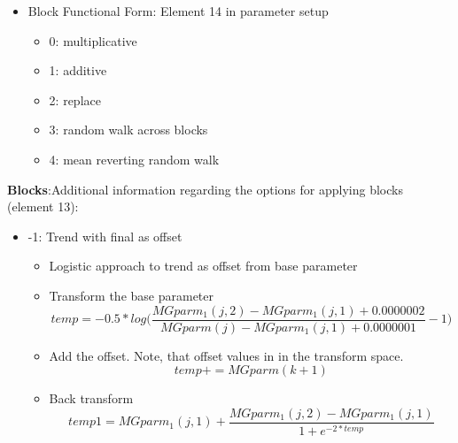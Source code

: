 \begin{itemize}
	\item Block Functional Form: Element 14 in parameter setup
		\begin{itemize}
			\item 0: multiplicative 
			\item 1: additive
			\item 2: replace
			\item 3: random walk across blocks
			\item 4: mean reverting random walk
		\end{itemize}
\end{itemize}

\noindent \textbf{Blocks}:Additional information regarding the options for applying blocks (element 13):
\begin{itemize} 
	\item -1: Trend with final as offset
		\begin{itemize}
			\item Logistic approach to trend as offset from base parameter
			\item Transform the base parameter
			\begin{equation}
				temp = -0.5*log\Bigg(\frac{MGparm_1(j,2)-MGparm_1(j,1)+0.0000002}{MGparm(j)-MGparm_1(j,1)+0.0000001}-1\Bigg)
			\end{equation}
			\item Add the offset.  Note, that offset values in in the transform space.
			\begin{equation}
				temp += MGparm(k+1)
			\end{equation}
			\item Back transform
			\begin{equation}
				temp1 = MGparm_1(j,1)+\frac{MGparm_1(j,2)-MGparm_1(j,1)}{1+e^{-2*temp}}
			\end{equation}			
		\end{itemize}
\end{itemize}



